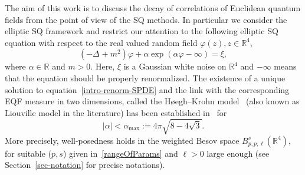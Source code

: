 \documentclass{article}
\newcommand{\assign}{:=}
\begin{document}
The aim of this work is to discuss the decay of correlations of Euclidean
quantum fields from the point of view of the SQ methods. In particular we
consider the elliptic SQ framework and restrict our attention to the following
elliptic SQ equation with respect to the real valued random field $\varphi
(z), z \in \mathbb{R}^4$,
\begin{equation}
  (- \Delta_{} + m^2) \varphi + \alpha \exp (\alpha \varphi - \infty) = \xi,
  \label{intro-renorm-SPDE}
\end{equation}
where $\alpha \in \mathbb{R}$ and $m > 0$. Here, $\xi$ is a Gaussian white
noise on $\mathbb{R}^4$ and $- \infty$ means that the equation should be
properly renormalized. The existence of a unique solution to
equation~\eqref{intro-renorm-SPDE} and the link with the corresponding EQF
measure in two dimensions, called the H{\o}egh--Krohn model~{\cite{HK71}} (also
known as Liouville model in the literature) has been established
in~{\cite{AVG2021}} for
\[ | \alpha | < \alpha_{\max} \assign 4 \pi \sqrt{8 - 4 \sqrt{3}} . \]
More precisely, well-posedness holds in the weighted Besov space $B_{p, p,
\ell}^s (\mathbb{R}^4)$, for suitable  ($p, s$)  given
in~\eqref{rangeOfParams} and $\ell > 0$ large enough (see
Section~\ref{sec-notation} for precise notations). 
\end{document}

